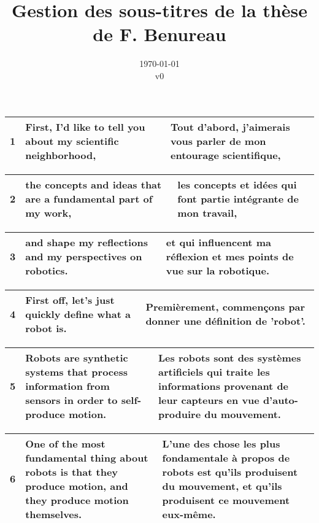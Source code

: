 \documentclass{article}
\title{Gestion des sous-titres de la thèse de F. Benureau}
\date{\today \\ v0}
\begin{document}
\maketitle

\begin{tabular}{ | p{1cm} | p{8cm} | p{8cm} |}
\hline
1 & First, I'd like to tell you about my scientific neighborhood,
 & Tout d'abord, j'aimerais vous parler de mon entourage scientifique,
 \\ 
\hline
\end{tabular}

\begin{tabular}{ | p{1cm} | p{8cm} | p{8cm} |}
\hline
2 & the concepts and ideas that are a fundamental part of my work,
 & les concepts et idées qui font partie intégrante de mon travail,
 \\ 
\hline
\end{tabular}

\begin{tabular}{ | p{1cm} | p{8cm} | p{8cm} |}
\hline
3 & and shape my reflections and my perspectives on robotics.
 & et qui influencent ma réflexion et mes points de vue sur la robotique.
 \\ 
\hline
\end{tabular}

\begin{tabular}{ | p{1cm} | p{8cm} | p{8cm} |}
\hline
4 & First off, let's just quickly define what a robot is.
 & Premièrement, commençons par donner une définition de 'robot'.
 \\ 
\hline
\end{tabular}

\begin{tabular}{ | p{1cm} | p{8cm} | p{8cm} |}
\hline
5 & Robots are synthetic systems that process information from sensors in order to self-produce motion.
 & Les robots sont des systèmes artificiels qui traite les informations provenant de leur capteurs en vue d'auto-produire du mouvement.
 \\ 
\hline
\end{tabular}

\begin{tabular}{ | p{1cm} | p{8cm} | p{8cm} |}
\hline
6 & One of the most fundamental thing about robots is that they produce motion, and they produce motion themselves.
 & L'une des chose les plus fondamentale à propos de robots est qu'ils produisent du mouvement, et qu'ils produisent ce mouvement eux-même.
 \\ 
\hline
\end{tabular}
\end{document}
